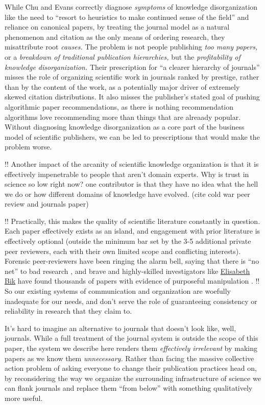 \documentclass[10pt]{tufte-book}
\begin{document}
While Chu and Evans correctly diagnose \emph{symptoms} of knowledge
disorganization like the need to ``resort to heuristics to make
continued sense of the field'' and reliance on canonical papers, by
treating the journal model as a natural phenomenon and citation as the
only means of ordering research, they misattribute root \emph{causes.}
The problem is not people publishing \emph{too many papers,} or a
\emph{breakdown of traditional publication hierarchies,} but the
\emph{profitability of knowledge disorganization.} Their prescription
for ``a clearer hierarchy of journals'' misses the role of organizing
scientific work in journals ranked by prestige, rather than by the
content of the work, as a potentially major driver of extremely skewed
citation distributions. It also misses the publisher's stated goal of
pushing algorithmic paper recommendations, as there is nothing
recommendation algorithms love recommending more than things that are
alreaady popular. Without diagnosing knowledge disorganization as a core
part of the business model of scientific publishers, we can be led to
prescriptions that would make the problem worse.

!! Another impact of the arcanity of scientific knowledge organization
is that it is effectively impenetrable to people that aren't domain
experts. Why is trust in science so low right now? one contributor is
that they have no idea what the hell we do or how different domains of
knowledge have evolved. (cite cold war peer review and journals paper)

!! Practically, this makes the quality of scientific literature
constantly in question. Each paper effectively exists as an island, and
engagement with prior literature is effectively optional (outside the
minimum bar set by the 3-5 additional private peer reviewers, each with
their own limited scope and conflicting interests). Forensic
peer-reviewers have been ringing the alarm bell, saying that there is
``no net'' to bad research \citep{heathersRealScandalIvermectin2021} , and brave and highly-skilled investigators like
\href{https://scienceintegritydigest.com/}{Elisabeth Bik} have found
thousands of papers with evidence of purposeful manipulation \citep{shenMeetThisSuperspotter2020, bikPrevalenceInappropriateImage2016} .
!! So our existing systems of communication and organization are
woefully inadequate for our needs, and don't serve the role of
guaranteeing consistency or reliability in research that they claim to.

It's hard to imagine an alternative to journals that doesn't look like,
well, journals. While a full treatment of the journal system is outside
the scope of this paper, the system we describe here renders them
\emph{effectively irrelevant} by making papers as we know them
\emph{unnecessary.} Rather than facing the massive collective action
problem of asking everyone to change their publication practices head
on, by reconsidering the way we organize the surrounding infrastructure
of science we can flank journals and replace them ``from below'' with
something qualitatively more useful.
\end{document}
